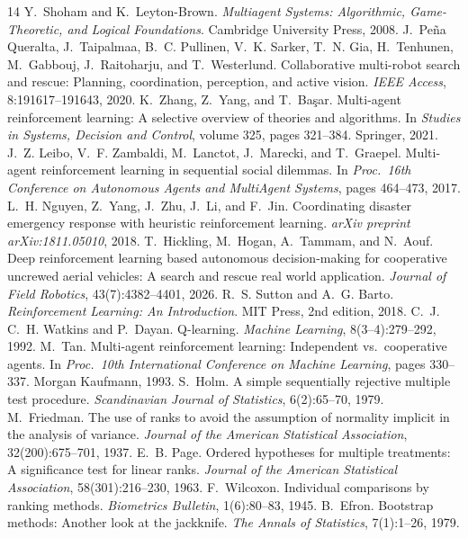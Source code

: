 \documentclass{article}
\begin{document}
\begin{thebibliography}{14}
 Y.~Shoham and K.~Leyton-Brown. \emph{Multiagent Systems: Algorithmic, Game-Theoretic, and Logical
Foundations}. Cambridge University Press, 2008.
 J.~Pe\~na Queralta, J.~Taipalmaa, B.~C. Pullinen, V.~K. Sarker, T.~N. Gia, H.~Tenhunen,
M.~Gabbouj, J.~Raitoharju, and T.~Westerlund. Collaborative multi-robot search and rescue: Planning, coordination,
perception, and active vision. \emph{IEEE Access}, 8:191617--191643, 2020.
 K.~Zhang, Z.~Yang, and T.~Ba\c{s}ar. Multi-agent reinforcement learning: A selective overview of
theories and algorithms. In \emph{Studies in Systems, Decision and Control}, volume 325, pages 321--384. Springer, 2021.
 J.~Z. Leibo, V.~F. Zambaldi, M.~Lanctot, J.~Marecki, and T.~Graepel. Multi-agent reinforcement
learning in sequential social dilemmas. In \emph{Proc.\ 16th Conference on Autonomous Agents and MultiAgent Systems},
pages 464--473, 2017.
 L.~H. Nguyen, Z.~Yang, J.~Zhu, J.~Li, and F.~Jin. Coordinating disaster emergency response with
heuristic reinforcement learning. \emph{arXiv preprint arXiv:1811.05010}, 2018.
 T.~Hickling, M.~Hogan, A.~Tammam, and N.~Aouf. Deep reinforcement learning based autonomous
decision-making for cooperative uncrewed aerial vehicles: A search and rescue real world application. \emph{Journal of
Field Robotics}, 43(7):4382--4401, 2026.
 R.~S. Sutton and A.~G. Barto. \emph{Reinforcement Learning: An Introduction}. MIT Press, 2nd
edition, 2018.
 C.~J. C.~H. Watkins and P.~Dayan. Q-learning. \emph{Machine Learning}, 8(3--4):279--292, 1992.
 M.~Tan. Multi-agent reinforcement learning: Independent vs.\ cooperative agents. In \emph{Proc.\ 10th
International Conference on Machine Learning}, pages 330--337. Morgan Kaufmann, 1993.
 S.~Holm. A simple sequentially rejective multiple test procedure. \emph{Scandinavian Journal of
Statistics}, 6(2):65--70, 1979.
 M.~Friedman. The use of ranks to avoid the assumption of normality implicit in the analysis of
variance. \emph{Journal of the American Statistical Association}, 32(200):675--701, 1937.
 E.~B. Page. Ordered hypotheses for multiple treatments: A significance test for linear ranks.
\emph{Journal of the American Statistical Association}, 58(301):216--230, 1963.
 F.~Wilcoxon. Individual comparisons by ranking methods. \emph{Biometrics Bulletin}, 1(6):80--83,
1945.
 B.~Efron. Bootstrap methods: Another look at the jackknife. \emph{The Annals of Statistics},
7(1):1--26, 1979.
\end{thebibliography}
\end{document}
